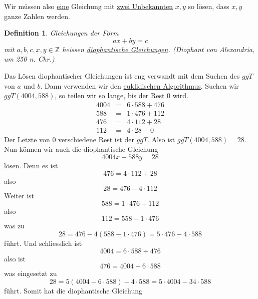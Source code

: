 \documentclass{report}
\newtheorem{mydef}{Definition}
\begin{document}
Wir müssen also \underline{eine} Gleichung mit \underline{zwei Unbekannten} $x, y$ so lösen, dass $x ,y$ ganze Zahlen werden.
\begin{mydef}Gleichungen der Form
\begin{equation}ax + by = c\end{equation}
mit $a, b, c, x, y \in \mathbb{Z}$ heissen \underline{diophantische Gleichungen}. (Diophant von Alexandria, um 250 n. Chr.)\end{mydef}
Das Lösen diophantischer Gleichungen ist eng verwandt mit dem Suchen des $ggT$ von $a$ und $b$. Dann verwenden wir den \underline{euklidischen Algorithmus}. Suchen wir $ggT(4004, 588)$, so teilen wir so lange, bis der Rest 0 wird.
\begin{eqnarray}4004 & = & 6 \cdot 588 + 476\\
588 & = & 1 \cdot 476 + 112\\
476 & = & 4 \cdot 112 + 28\\
112 & = & 4 \cdot 28 + 0\end{eqnarray}
Der Letzte von 0 verschiedene Rest ist der $ggT$. Also ist $ggT(4004, 588) = 28$.
Nun können wir auch die diophantische Gleichung
\begin{equation}4004x + 588y = 28\end{equation}
lösen. Denn es ist
\begin{equation}476 = 4 \cdot 112 + 28\end{equation}
also
\begin{equation}28 = 476 - 4 \cdot 112\end{equation}
Weiter ist
\begin{equation}588 = 1 \cdot 476 + 112\end{equation}
also
\begin{equation}112 = 558 - 1 \cdot 476\end{equation}
was zu
\begin{equation}28 = 476 - 4 (588 - 1 \cdot 476) = 5 \cdot 476 - 4 \cdot 588\end{equation}
führt. Und schliesslich ist
\begin{equation}4004 = 6 \cdot 588 + 476\end{equation}
also ist
\begin{equation}476 = 4004 - 6 \cdot 588\end{equation}
was eingesetzt zu
\begin{equation}28 = 5 (4004 - 6 \cdot 588) - 4 \cdot 588 = 5 \cdot 4004 - 34 \cdot 588\end{equation}
führt. Somit hat die diophantische Gleichung
\end{document}
